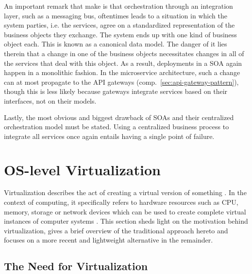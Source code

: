 An important remark that \citeauthor{cerny2018contextual} make is that orchestration through an integration layer, such as a messaging bus, oftentimes leads to a situation in which the system parties, i.e. the services, agree on a standardized representation of the business objects they exchange. The system ends up with one kind of business object each. This is known as a canonical data model. The danger of it lies therein that a change in one of the business objects necessitates changes in all of the services that deal with this object. As a result, deployments in a \ac{SOA} again happen in a monolithic fashion. In the microservice architecture, such a change can at most propagate to the \acs{API} gateways (comp.~\autoref{sec:api-gateway-pattern}), though this is less likely because gateways integrate services based on their interfaces, not on their models.

Lastly, the most obvious and biggest drawback of \acp{SOA} and their centralized orchestration model must be stated. Using a centralized business process to integrate all services once again entails having a single point of failure.


\section{\acs*{OS}-level Virtualization}
\label{sec:os-level-virtualization}

Virtualization describes the act of creating a virtual version of something \cite[p.~2]{celesti2016exploring}. In the context of computing, it specifically refers to hardware resources such as \acs{CPU}, memory, storage or network devices which can be used to create complete virtual instances of computer systems \cite[p.~21]{da2018containers}. This section sheds light on the motivation behind virtualization, gives a brief overview of the traditional approach hereto and focuses on a more recent and lightweight alternative in the remainder.


\subsection{The Need for Virtualization}
\label{sec:virtualization-motivation}

